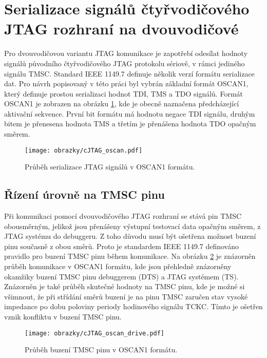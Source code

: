 \section{Serializace signálů čtyřvodičového \acs{JTAG} rozhraní na dvouvodičové}	\label{sec:oscan1} 

Pro dvouvodičovou variantu \acs{JTAG} komunikace je zapotřebí odesílat hodnoty signálů původního čtyřvodičového \acs{JTAG} protokolu sériově, v rámci jediného signálu \acs{TMSC}. Standard IEEE 1149.7 definuje několik verzí formátu serializace dat. Pro návrh popisovaný v této práci byl vybrán základní formát OSCAN1, který definuje prostou serializaci hodnot \acs{TDI}, \acs{TMS} a \acs{TDO} signálů. Formát OSCAN1 je zobrazen na obrázku \ref{fig:oscan}, kde je obecně naznačena předcházející aktivační sekvence. První bit formátu má hodnotu negace \acs{TDI} signálu, druhým bitem je přenesena hodnota \acs{TMS} a třetím je přenášena hodnota \acs{TDO}	opačným směrem. \cite{IEEE_1149-7}

\begin{figure}[!h]
  \begin{center}
    \texttt{[image: obrazky/cJTAG\_oscan.pdf]}
  \end{center}
  \caption{Průběh serializace \acs{JTAG} signálů v OSCAN1 formátu.}
	\label{fig:oscan}
\end{figure}
    
\subsection{Řízení úrovně na \acs{TMSC} pinu}	\label{subsec:oscan1_drive} 
Při komunikaci pomocí dvouvodičového \acs{JTAG} rozhraní se stává pin \acs{TMSC} obousměrným, jelikož jsou přenášeny výstupní testovací data opačným směrem, z \acs{JTAG} systému do debuggeru. Z toho důvodu musí být ošetřena možnost buzení pinu současně z obou směrů. Proto je standardem IEEE 1149.7 definováno pravidlo pro buzení \acs{TMSC} pinu během komunikace. Na obrázku \ref{fig:oscan_drive} je znázorněn průběh komunikace v OSCAN1 formátu, kde jsou přehledně znázorněny okamžiky buzení \acs{TMSC} pinu debuggerem (\acs{DTS}) a \acs{JTAG} systémem (\acs{TS}). Znázorněn je také průběh skutečné hodnoty na \acs{TMSC} pinu, kde je možné si všimnout, že při střídání směrů buzení je na pinu \acs{TMSC} zaručen stav vysoké impedance po dobu poloviny periody hodinového signálu \acs{TCKC}. Tímto je ošetřen vznik konfliktu v buzení \acs{TMSC} pinu. \cite{IEEE_1149-7}

\begin{figure}[!h]
  \begin{center}
    \texttt{[image: obrazky/cJTAG\_oscan\_drive.pdf]}
  \end{center}
  \caption{Průběh buzení \acs{TMSC} pinu v OSCAN1 formátu.}
	\label{fig:oscan_drive}
\end{figure}

